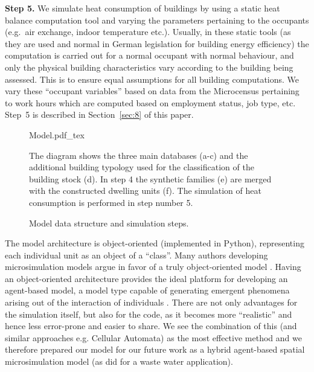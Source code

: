 \documentclass[11pt]{IJM-article}
\begin{document}
\textbf{Step 5.} We simulate heat consumption of buildings by using a static
heat balance computation tool and varying the parameters pertaining to the
occupants (e.g.\ air exchange, indoor temperature etc.). Usually, in these
static tools (as they are used and normal in German legislation for building
energy efficiency) the computation is carried out for a normal occupant with
normal behaviour, and only the physical building characteristics vary according
to the building being assessed. This is to ensure equal assumptions for all
building computations. We vary these ``occupant variables'' based on data from
the Microcensus pertaining to work hours which are computed based on employment
status, job type, etc. Step~5 is described in Section~\ref{sec:8} of this
paper.\\

\begin{figure}[htb] 
    \centering
    \caption{Model data structure and simulation steps.}\label{fig:1}
	\def\svgwidth{0.77\linewidth}
    {Model.pdf_tex}\\ 
    \begin{flushleft}
    \begin{footnotesize}
    The diagram shows the three main databases (a-c) and the additional
building typology used for the classification of the building stock (d). In
step 4 the synthetic families (e) are merged with the constructed dwelling
units (f). The simulation of heat consumption is performed in step number 5.
    \end{footnotesize}
    \end{flushleft}
\end{figure}

The model architecture is object-oriented (implemented in Python), representing
each individual unit as an object of a ``class''. Many authors developing
microsimulation models argue in favor of a truly object-oriented model
. Having an object-oriented
architecture provides the ideal platform for developing an agent-based model, a
model type capable of generating emergent phenomena arising out of the
interaction of individuals . There are not only advantages
for the simulation itself, but also for the code, as it becomes more
``realistic'' and hence less error-prone and easier to share. We see the
combination of this (and similar approaches e.g. Cellular Automata) as the most
effective method and we therefore prepared our model for our future work as a
hybrid agent-based spatial microsimulation model (as did 
for a waste water application).
\end{document}
